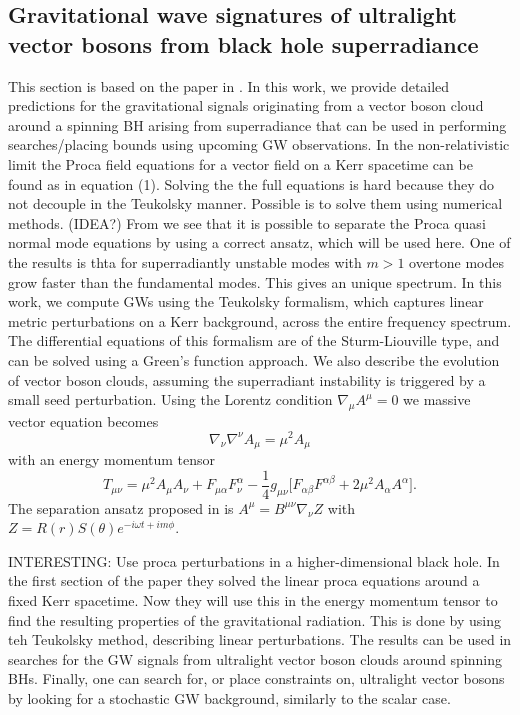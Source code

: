 \documentclass[12 pt]{article}
\begin{document}
	\subsection{Gravitational wave signatures of ultralight vector bosons
		from black hole superradiance}
	This section is based on the paper in \cite{vectorhair}.
	In this work, we provide detailed predictions for the gravitational signals originating from a vector boson cloud around a spinning BH arising from superradiance that can be used in performing searches/placing bounds using upcoming GW observations. In the non-relativistic limit the Proca field equations for a vector field on a Kerr spacetime can be found as in equation (1). Solving the the full equations is hard because they do not decouple in the Teukolsky manner. Possible is to solve them using numerical methods. (IDEA?) From \cite{procaansatz} we see that it is possible to separate the Proca quasi normal mode equations by using a correct ansatz, which will be used here. One of the results is thta for superradiantly unstable modes with $m > 1$ overtone modes grow faster than the fundamental modes. This gives an unique spectrum. In this work, we compute GWs using the Teukolsky formalism, which captures linear metric perturbations on a Kerr background, across the entire frequency spectrum. The differential equations of this formalism are of the Sturm-Liouville type, and can be solved using a
	Green’s function approach. We also describe the evolution of vector boson clouds, assuming the superradiant instability is triggered by a small seed perturbation. Using the Lorentz condition $ \nabla_{\mu}A^{\mu} = 0$ we massive vector equation becomes 
	\begin{equation}
		\nabla_{\nu} \nabla^{\nu} A_{\mu} = \mu^2 A_{\mu}
	\end{equation}
	with an energy momentum tensor 
	\begin{equation}
		T_{\mu \nu} = \mu^2 A_{\mu} A_{\nu} + F_{\mu \alpha} F_{\nu}^{\alpha} - \frac{1}{4} g_{\mu \nu} \big[F_{\alpha \beta} F^{\alpha \beta} + 2 \mu^2 A_{\alpha} A^{\alpha} \big]. 
	\end{equation}
	The separation ansatz proposed in \cite{procaansatz} is $A^{\mu} = B^{\mu \nu} \nabla_{\nu} Z$ with $Z= R(r)S(\theta)e^{-i \omega t + im \phi}$.
	
	INTERESTING: Use proca perturbations in a higher-dimensional black hole. 
	In the first section of the paper they solved the linear proca equations around a fixed Kerr spacetime. Now they will use this in the energy momentum tensor to find the resulting properties of the gravitational radiation. This is done by using teh Teukolsky method, describing linear perturbations. The results can be used in searches for the GW signals from ultralight vector boson clouds around spinning BHs. Finally, one can search for, or place constraints on, ultralight vector bosons by looking for a stochastic GW background, similarly to the scalar case. 
	
\end{document}
